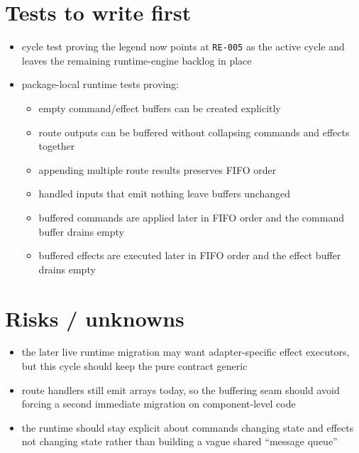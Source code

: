 \section{Tests to write first}\label{record-153-tests-to-write-first}

\begin{itemize}
\tightlist
\item
  cycle test proving the legend now points at \texttt{R\allowbreak{}E\allowbreak{}-\allowbreak{}0\allowbreak{}0\allowbreak{}5} as the active cycle and leaves the remaining runtime-engine backlog in place
\item
  package-local runtime tests proving:

  \begin{itemize}
  \tightlist
  \item
    empty command/effect buffers can be created explicitly
  \item
    route outputs can be buffered without collapsing commands and effects together
  \item
    appending multiple route results preserves FIFO order
  \item
    handled inputs that emit nothing leave buffers unchanged
  \item
    buffered commands are applied later in FIFO order and the command buffer drains empty
  \item
    buffered effects are executed later in FIFO order and the effect buffer drains empty
  \end{itemize}
\end{itemize}

\section{Risks / unknowns}\label{record-153-risks-unknowns}

\begin{itemize}
\tightlist
\item
  the later live runtime migration may want adapter-specific effect executors, but this cycle should keep the pure contract generic
\item
  route handlers still emit arrays today, so the buffering seam should avoid forcing a second immediate migration on component-level code
\item
  the runtime should stay explicit about commands changing state and effects not changing state rather than building a vague shared ``message queue''
\end{itemize}

